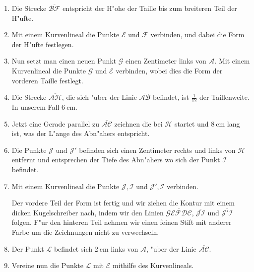 \documentclass{scrartcl}
\begin{document}
\begin{enumerate}
  \item Die Strecke $\overline{\mathcal{BF}}$ entspricht der H"ohe
    der Taille bis zum breiteren Teil der H"ufte.

  \item Mit einem Kurvenlineal die Punkte $\mathcal{E}\text{ und }
      \mathcal{F}$ verbinden, und dabei die Form der H"ufte festlegen.
 
  \item Nun setzt man einen neuen Punkt $\mathcal{G}$ einen Zentimeter links
      von $\mathcal{A}$. Mit einem Kurvenlineal die Punkte
      $\mathcal{G}\text{ und }\mathcal{E}$ verbinden, wobei dies die Form der
      vorderen Taille festlegt.

  \item Die Strecke $\overline{\mathcal{AH}}$, die sich "uber der Linie 
    $\overline{\mathcal{AB}}$ befindet, ist $\frac{1}{12}$ der
    Taillenweite. In unserem Fall $\SI{6}{\centi\meter}$. 

  \item Jetzt eine Gerade parallel zu $\overline{\mathcal{AC}}$ zeichnen die
      bei $\mathcal{H}$ startet und $\SI{8}{\centi\meter}$ lang ist, was der
      L"ange des Abn"ahers entspricht.%

    \item Die Punkte $\mathcal{J}\text{ und }\mathcal{J'}$ befinden sich einen 
      Zentimeter rechts und links von $\mathcal{H}$ entfernt und entsprechen der 
      Tiefe des Abn"ahers wo sich der Punkt  $\mathcal{I}$ befindet.
     
    \item Mit einem Kurvenlineal die Punkte $\mathcal{J,I}$ und $\mathcal{J',I}$
      verbinden.

    Der vordere Teil der Form ist fertig und wir ziehen die Kontur mit
    einem dicken Kugelschreiber nach, indem wir den Linien
    $\overline{\mathcal{GEFDC}}$, $\overline{\mathcal{JI}}$ und 
    $\overline{\mathcal{J'I}}$ folgen. 
    F"ur den hinteren Teil nehmen wir einen feinen Stift mit anderer Farbe
    um die Zeichnungen nicht zu verwechseln.

  \item Der Punkt $\mathcal{L}$ befindet sich $\SI{2}{\centi\meter}$
    links von $\mathcal{A}$, "uber der Linie $\overline{\mathcal{AC}}$.

  \item Vereine nun die Punkte $\mathcal{L}$ mit $\mathcal{E}$ mithilfe des
    Kurvenlineals.  


\end{enumerate}
\end{document}
